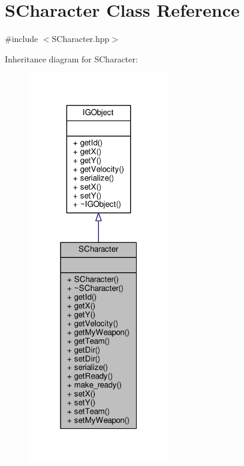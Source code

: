 \hypertarget{class_s_character}{}\section{S\+Character Class Reference}
\label{class_s_character}


{\ttfamily \#include $<$S\+Character.\+hpp$>$}



Inheritance diagram for S\+Character\+:\nopagebreak
\begin{figure}[H]
\begin{center}
\leavevmode
\includegraphics[width=175pt]{class_s_character__inherit__graph}
\end{center}
\end{figure}


